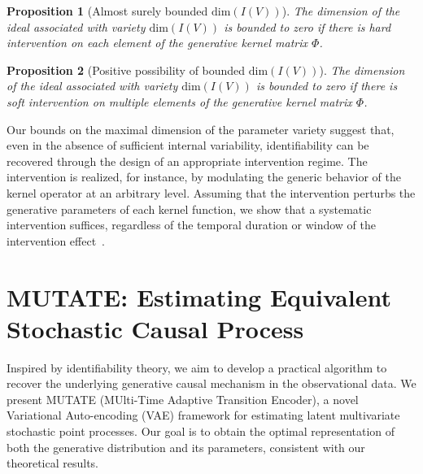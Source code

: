 \documentclass[10pt]{article}
\numberwithin{figure}{section}
\newtheorem{proposition}{Proposition}[section]
\begin{document}
\begin{proposition}[Almost surely bounded $\mathrm{dim}(I(V))$]
    The dimension of the ideal associated with variety $\mathrm{dim}(I(V))$ is bounded to zero if there is hard intervention on each element of the generative kernel matrix $\Phi$. 
\end{proposition}
\begin{proposition}[Positive possibility of bounded $\mathrm{dim}(I(V))$]
        The dimension of the ideal associated with variety $\mathrm{dim}(I(V))$ is bounded to zero if there is soft intervention on multiple elements of the generative kernel matrix $\Phi$. 
\end{proposition}

Our bounds on the maximal dimension of the parameter variety suggest that, even in the absence of sufficient internal variability, identifiability can be recovered through the design of an appropriate intervention regime. The intervention is realized, for instance, by modulating the generic behavior of the kernel operator at an arbitrary level. Assuming that the intervention perturbs the generative parameters of each kernel function, we show that a systematic intervention suffices, regardless of the temporal duration or window of the intervention effect~\citep{lippeCausalRepresentationLearning2023}.



\section{MUTATE: Estimating Equivalent Stochastic Causal Process}

Inspired by identifiability theory, we aim to develop a practical algorithm to recover the underlying generative causal mechanism in the observational data. We present MUTATE (MUlti-Time Adaptive Transition Encoder), a novel Variational Auto-encoding (VAE) framework for estimating latent multivariate stochastic point processes. Our goal is to obtain the optimal representation of both the generative distribution and its parameters, consistent with our theoretical results.
\end{document}
